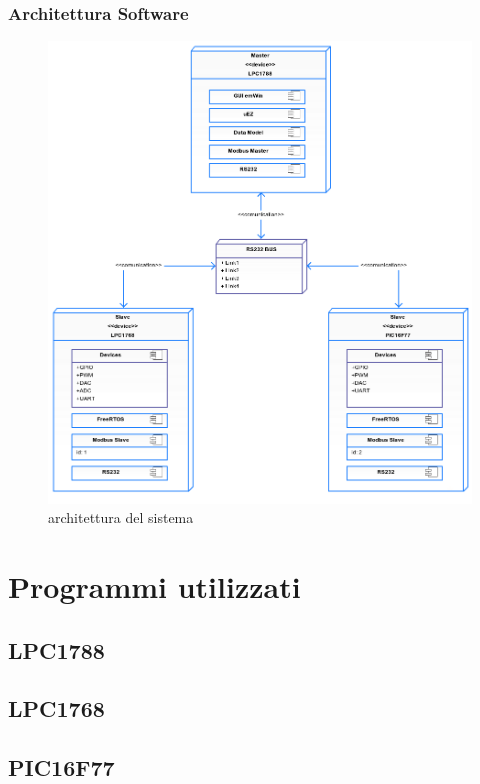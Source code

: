\documentclass[a4paper,titlepage]{book}
\begin{document}
\subsection{Architettura Software}
\begin{figure}[!h]
\centering
\includegraphics[scale=0.3]{deploy.png}
\caption{architettura del sistema}\label{fig:1}



\end{figure}


\chapter{Programmi utilizzati}

\section{LPC1788}


\section{LPC1768}


\section{PIC16F77}
\end{document}
